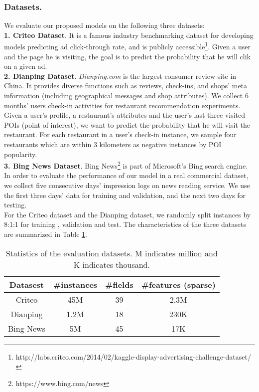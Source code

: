 \subsubsection{Datasets.} We evaluate our proposed models on the following three datasets:\\
\indent \textbf{1. Criteo Dataset}. It is a famous industry benchmarking dataset for developing models predicting ad click-through rate, and is publicly accessible\footnote{http://labs.criteo.com/2014/02/kaggle-display-advertising-challenge-dataset/}. Given a user and the page he is visiting, the goal is to predict the probability that he will clik on a given ad. \\
\indent \textbf{2. Dianping Dataset}. \textsl{Dianping.com} is the largest consumer review site in China. It provides diverse functions such as reviews, check-ins, and shops' meta information (including geographical messages and shop attributes). We collect 6 months' users check-in activities for restaurant recommendation experiments. Given a user's profile, a restaurant's attributes and the user's last three visited POIs (point of interest), we want to predict the probability that he will visit the restaurant. For each restaurant in a user's check-in instance, we sample four restaurants which are within 3 kilometers as negative instances by POI popularity.\\
\indent \textbf{3. Bing News Dataset}. Bing News\footnote{https://www.bing.com/news} is part of Microsoft's Bing search engine. In order to evaluate the performance of our model in a real commercial dataset, we collect five consecutive days' impression logs on news reading service. We use the first three days' data for training and validation, and the next two days for testing.  \\
\indent For the Criteo dataset and the Dianping dataset, we randomly split instances by 8:1:1 for training , validation and test. The characteristics of the three datasets are summarized in Table \ref{tab:datasets}.
  \begin{table}[ht]
     \centering
     \caption{Statistics of the evaluation datasets. M indicates million and K indicates thousand. }
     \begin{tabular}{|c|c|c|c|} \hline
        Datasest  &  \#instances & \#fields &\#features (sparse)  \\ \hline    
        Criteo    &  45M & 39 & 2.3M \\ \hline           
        Dianping &  1.2M & 18 & 230K \\ \hline   
        Bing News &  5M & 45 & 17K \\  \hline
     \end{tabular}
     \label{tab:datasets} 
 \end{table}
